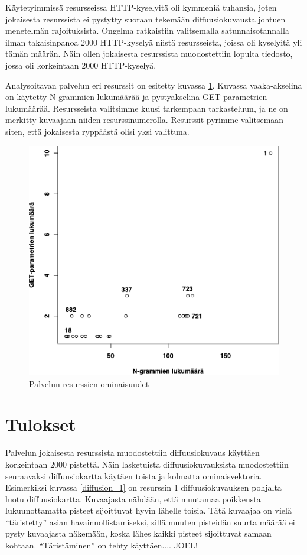 Käytetyimmissä resursseissa HTTP-kyselyitä oli kymmeniä tuhansia, joten jokaisesta resurssista ei pystytty suoraan tekemään diffuusiokuvausta johtuen
menetelmän rajoituksista. Ongelma ratkaistiin valitsemalla satunnaisotannalla ilman takaisinpanoa 2000 HTTP-kyselyä niistä resursseista, joissa oli 
kyselyitä yli tämän määrän. Näin ollen jokaisesta resurssista muodostettiin lopulta tiedosto, jossa oli korkeintaan 2000 HTTP-kyselyä.

Analysoitavan palvelun eri resurssit on esitetty kuvassa \ref{service_resources}. Kuvassa vaaka-akselina on käytetty N-grammien lukumäärää ja 
pystyakselina GET-parametrien lukumäärää. Resursseista valitsimme kuusi tarkempaan tarkasteluun, ja ne on merkitty kuvaajaan niiden resurssinumerolla. 
Resurssit pyrimme valitsemaan siten, että jokaisesta ryppäästä olisi yksi valittuna.

\begin{figure}[ht]
\centering
\includegraphics[width=13cm]{pics/service_resources.pdf}
\caption{Palvelun resurssien ominaisuudet}
\label{service_resources}
\end{figure}

\section{Tulokset}

Palvelun jokaisesta resurssista muodostettiin diffuusiokuvaus käyttäen korkeintaan 2000 pistettä. Näin lasketuista diffuusiokuvauksista muodostettiin
seuraavaksi diffuusiokartta käytäen toista ja kolmatta ominaisvektoria. Esimerkiksi kuvassa \ref{diffusion_1} on resurssin 1 diffuusiokuvauksen pohjalta
luotu diffuusiokartta. Kuvaajasta nähdään, että muutamaa poikkeusta lukuunottamatta pisteet sijoittuvat hyvin lähelle toisia. Tätä kuvaajaa on 
vielä ``täristetty'' asian havainnollistamiseksi, sillä muuten pisteidän suurta määrää ei pysty kuvaajasta näkemään, koska lähes kaikki pisteet 
sijoittuvat samaan kohtaan. ``Täristäminen'' on tehty käyttäen.... JOEL!

